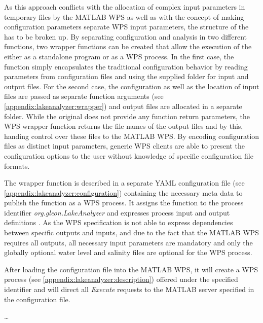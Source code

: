   As this approach conflicts with the allocation of complex input parameters in temporary files by the MATLAB WPS as well as with the concept of making configuration parameters separate \ac{WPS} input parameters, the structure of the \la has to be broken up. By separating configuration and analysis in two different functions, two wrapper functions can be created that allow the execution of the \la either as a standalone program or as a WPS process. In the first case, the function simply encapsulates the traditional configuration behavior by reading parameters from configuration files and using the supplied folder for input and output files. For the second case, the configuration as well as the location of input files are passed as separate function arguments (see \cref{appendix:lakeanalyzer:wrapper}) and output files are allocated in a separate folder. While the original \la does not provide any function return parameters, the WPS wrapper function returns the file names of the output files and by this, handing control over these files to the MATLAB WPS. By encoding configuration files as distinct input parameters, generic WPS clients are able to present the configuration options to the user without knowledge of specific configuration file formats.

  The wrapper function is described in a separate YAML configuration file (see \cref{appendix:lakeanalyzer:configuration}) containing the necessary meta data to publish the function as a WPS process. It assigns the function to the process identifier \emph{org.gleon.LakeAnalyzer} and expresses process input and output definitions \citep[taken from the \la user manual,][]{lamanual}. As the WPS specification is not able to express dependencies between specific outputs and inputs, and due to the fact that the MATLAB WPS requires all outputs, all necessary input parameters are mandatory and only the globally optional water level and salinity files are optional for the WPS process.

  After loading the configuration file into the MATLAB WPS, it will create a WPS process (see \cref{appendix:lakeanalyzer:description}) offered under the specified identifier and will direct all \emph{Execute} requests to the MATLAB server specified in the configuration file.

  \dots